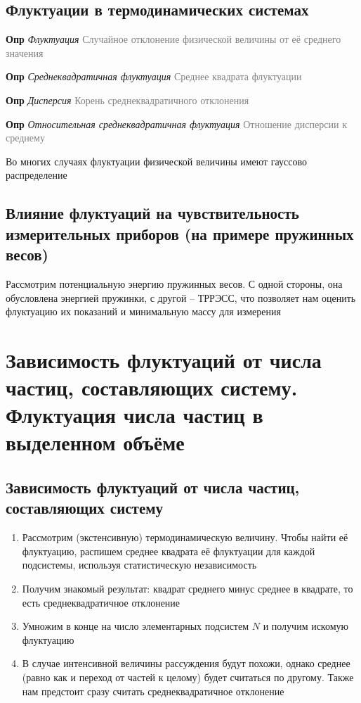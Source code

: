 \documentclass[a4paper, 14pt]{article}
\begin{document}
    \subsection{Флуктуации в термодинамических системах}

    \textbf{Опр} \textit{Флуктуация} \textcolor{gray}{Случайное отклонение физической величины от её среднего значения}

    \textbf{Опр} \textit{Среднеквадратичная флуктуация} \textcolor{gray}{Среднее квадрата флуктуации}

    \textbf{Опр} \textit{Дисперсия} \textcolor{gray}{Корень среднеквадратичного отклонения}

    \textbf{Опр} \textit{Относительная среднеквадратичная флуктуация} \textcolor{gray}{Отношение дисперсии к среднему}

    Во многих случаях флуктуации физической величины имеют гауссово распределение

    \subsection{Влияние флуктуаций на чувствительность измерительных приборов (на примере пружинных весов)}

    Рассмотрим потенциальную энергию пружинных весов.
    С одной стороны, она обусловлена энергией пружинки, с другой -- ТРРЭСС, что позволяет нам оценить флуктуацию
    их показаний и минимальную массу для измерения

    \section{Зависимость флуктуаций от числа частиц, составляющих систему.
    Флуктуация числа частиц в выделенном объёме}

    \subsection{Зависимость флуктуаций от числа частиц, составляющих систему}

    \begin{enumerate}
        \item Рассмотрим (экстенсивную) термодинамическую величину.
        Чтобы найти её флуктуацию, распишем среднее квадрата её флуктуации для каждой подсистемы, используя
        статистическую независимость
        \item Получим знакомый результат: квадрат среднего минус среднее в квадрате, то есть среднеквадратичное
        отклонение
        \item Умножим в конце на число элементарных подсистем $N$ и получим искомую флуктуацию
        \item В случае интенсивной величины рассуждения будут похожи, однако среднее (равно как и переход от частей
        к целому) будет считаться по другому.
        Также нам предстоит сразу считать среднеквадратичное отклонение
    \end{enumerate}
\end{document}
